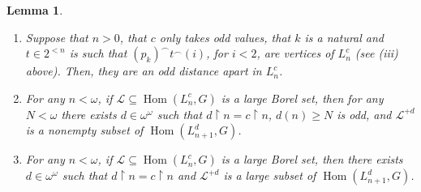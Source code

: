 \documentclass[10pt,a4paper]{amsart}
\newtheorem{lemma}{Lemma}
\DeclareMathOperator{\Hom}{Hom}
\begin{document}
\begin{lemma}\label{lemma:Ln_basics}~ 
    \begin{enumerate}[label=(\alph*)]
        \item Suppose that $n>0$, that $c$ only takes odd values, that $k$ is a natural and $t\in2^{<n}$ is such that $(p_k)^\smallfrown t^\smallfrown(i)$, for $i<2$, are vertices of $L^c_n$ (see (iii) above). Then, they are an odd distance apart in $L^c_n$.

        \item For any $n<\omega$, if $\mathcal L\subseteq\Hom(L^c_n,G)$ is a large Borel set, then for any $N<\omega$ there exists $d\in\omega^\omega$ such that $d\restriction n=c\restriction n$, $d(n)\geq N$ is odd, and $\mathcal L^{+d}$ is a nonempty subset of $\Hom(L^{d}_{n+1},G)$.

        \item For any $n<\omega$, if $\mathcal L\subseteq\Hom(L^c_n,G)$ is a large Borel set, then there exists $d\in\omega^\omega$ such that $d\restriction n=c\restriction n$ and $\mathcal L^{+d}$ is a large subset of $\Hom(L^{d}_{n+1},G)$.
    \end{enumerate}
\end{lemma}
\end{document}
